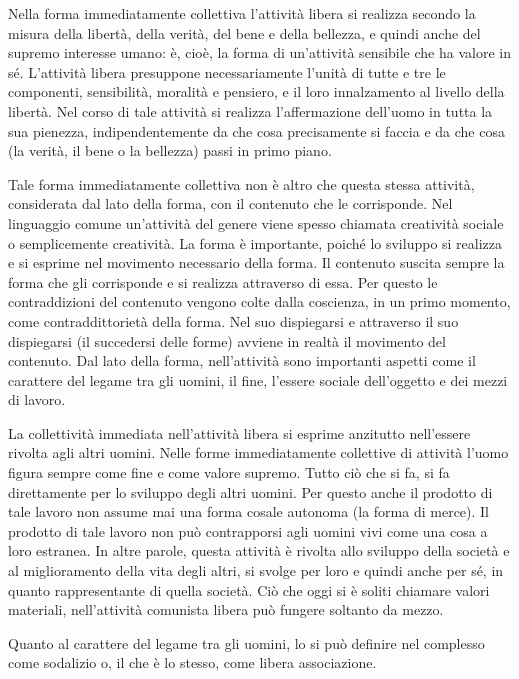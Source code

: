 \documentclass[../main]{subfiles}
\begin{document}
Nella forma immediatamente collettiva l'attività libera si realizza secondo la misura della libertà, della verità, del bene e della bellezza, e quindi anche del supremo interesse umano: è, cioè, la forma di un'attività sensibile che ha valore in sé. L'attività libera presuppone necessariamente l'unità di tutte e tre le componenti, sensibilità, moralità e pensiero, e il loro innalzamento al livello della libertà. Nel corso di tale attività si realizza l'affermazione dell'uomo in tutta la sua pienezza, indipendentemente da che cosa precisamente si faccia e da che cosa (la verità, il bene o la bellezza) passi in primo piano.

Tale forma immediatamente collettiva non è altro che questa stessa attività, considerata dal lato della forma, con il contenuto che le corrisponde. Nel linguaggio comune un'attività del genere viene spesso chiamata creatività sociale o semplicemente creatività. La forma è importante, poiché lo sviluppo si realizza e si esprime nel movimento necessario della forma. Il contenuto suscita sempre la forma che gli corrisponde e si realizza attraverso di essa. Per questo le contraddizioni del contenuto vengono colte dalla coscienza, in un primo momento, come contraddittorietà della forma. Nel suo dispiegarsi e attraverso il suo dispiegarsi (il succedersi delle forme) avviene in realtà il movimento del contenuto. Dal lato della forma, nell'attività sono importanti aspetti come il carattere del legame tra gli uomini, il fine, l'essere sociale dell'oggetto e dei mezzi di lavoro.

La collettività immediata nell'attività libera si esprime anzitutto nell'essere rivolta agli altri uomini. Nelle forme immediatamente collettive di attività l'uomo figura sempre come fine e come valore supremo. Tutto ciò che si fa, si fa direttamente per lo sviluppo degli altri uomini. Per questo anche il prodotto di tale lavoro non assume mai una forma cosale autonoma (la forma di merce). Il prodotto di tale lavoro non può contrapporsi agli uomini vivi come una cosa a loro estranea. In altre parole, questa attività è rivolta allo sviluppo della società e al miglioramento della vita degli altri, si svolge per loro e quindi anche per sé, in quanto rappresentante di quella società. Ciò che oggi si è soliti chiamare valori materiali, nell'attività comunista libera può fungere soltanto da mezzo.

Quanto al carattere del legame tra gli uomini, lo si può definire nel complesso come sodalizio o, il che è lo stesso, come libera associazione.
\end{document}

